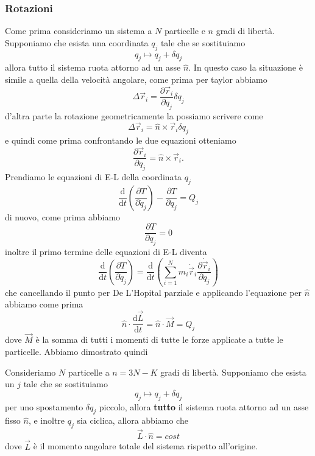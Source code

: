 \documentclass[11pt]{scrartcl}
\newcommand{\dif}{\text{d}}
\newcommand{\posit}{\vec{r}}
\newcommand{\veloc}{\dot{\vec{r}}}
\begin{document}
	\subsubsection{Rotazioni}
	Come prima consideriamo un sistema a $N$ particelle e $n$ gradi di libertà. Supponiamo che esista una coordinata $q_j$ tale che se sostituiamo
	$$q_j \mapsto q_j +\delta q_j$$
	allora tutto il sistema ruota attorno ad un asse $\hat{n}$. In questo caso la situazione è simile a quella della velocità angolare, come prima per taylor abbiamo
	$$\Delta \posit_i=\frac{\partial \posit_i}{\partial q_j}\delta q_j$$
	d'altra parte la rotazione geometricamente la possiamo scrivere come
	$$\Delta \posit_i=\hat{n}\times \posit_i \delta q_j$$
	e quindi come prima confrontando le due equazioni otteniamo
	$$\frac{\partial \posit_i}{\partial q_j}=\hat{n}\times \posit_i.$$
	Prendiamo le equazioni di E-L della coordinata $q_j$
	$$\frac{\dif}{\dif t}\left(\frac{\partial T}{\partial \dot{q}_j}\right)-\frac{\partial T}{\partial q_j}=Q_j$$ 
	di nuovo, come prima abbiamo
	$$\frac{\partial T}{\partial q_j}=0$$
	inoltre il primo termine delle equazioni di E-L diventa
	$$\frac{\dif }{\dif t}\left(\frac{\partial T}{\partial \dot{q}_j}\right)=\frac{\dif }{\dif t}\left(\sum_{i=1}^{N}m_i \veloc_i \frac{\partial \veloc_i}{\partial \dot{q}_j}\right)$$
	che cancellando il punto per De L'Hopital parziale e applicando l'equazione per $\hat{n}$ abbiamo come prima
	$$\hat{n}\cdot\frac{\dif \vec{L}}{\dif t}=\hat{n}\cdot\vec{M}=Q_j$$
	dove $\vec{M}$ è la somma di tutti i momenti di tutte le forze applicate a tutte le particelle. Abbiamo dimostrato quindi
	\begin{theorem}
		Consideriamo $N$ particelle a $n=3N-K$ gradi di libertà. Supponiamo che esista un $j$ tale che se sostituiamo 
		$$q_j \mapsto q_j +\delta q_j$$
		per uno spostamento $\delta q_j$ piccolo, allora \textbf{tutto} il sistema ruota attorno ad un asse fisso $\hat{n}$, e inoltre $q_j$ sia ciclica, allora abbiamo che 
		$$\vec{L}\cdot \hat{n}=cost$$
		dove $\vec{L}$ è il momento angolare totale del sistema rispetto all'origine.
	\end{theorem}
\end{document}
